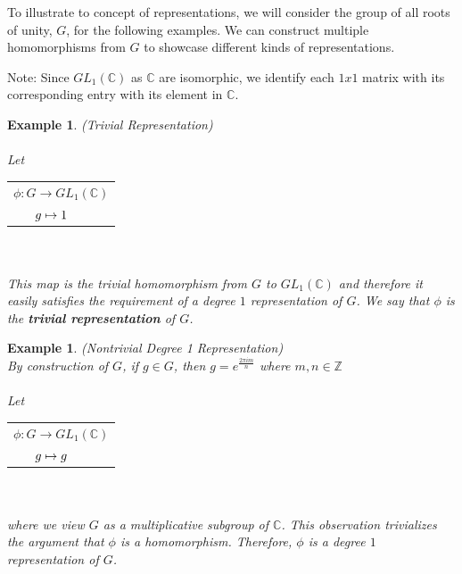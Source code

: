 \documentclass[10pt]{ucthesis}
\newtheorem{example}[definition]{Example}
\begin{document}
To illustrate to concept of representations, we will consider the group of all roots of unity, $G$, for the following examples. We can construct multiple homomorphisms from $G$ to showcase different kinds of representations. 

\noindent Note: Since $GL_1(\mathbb{C})$ as $\mathbb{C}$ are isomorphic, we identify each $1x1$ matrix with its corresponding entry with its element in $\mathbb{C}$.

\begin{example}
	(Trivial Representation)\\\\
	\renewcommand{\arraystretch}{0.7}
	Let   \begin{tabular}{l}$\phi:G\rightarrow GL_1(\mathbb{C})$\\
		$\hspace{6mm}g\mapsto 1$
		\end{tabular} \\\\
	This map is the trivial homomorphism from $G$ to $GL_1(\mathbb{C})$ and therefore it easily satisfies the requirement of a degree $1$ representation of $G$. We say that $\phi$ is the \textbf{trivial representation} of $G$.
\end{example}
	

\begin{example}
	(Nontrivial Degree 1 Representation) \\
	By construction of $G$, if $g\in G$, then $g = e^{\frac{2\pi im }{n}}$ where $m,n\in \mathbb{Z}$	
	\renewcommand{\arraystretch}{0.7}\\\\
	Let   \begin{tabular}{l}$\phi:G\rightarrow GL_1(\mathbb{C})$\\
		$\hspace{6mm}g\mapsto g$
		\end{tabular} \\\\
	where we view $G$ as a multiplicative subgroup of $\mathbb{C}$. This observation trivializes the argument that $\phi$ is a homomorphism. Therefore, $\phi$ is a degree $1$ representation of $G$.		
\end{example}
\end{document}
